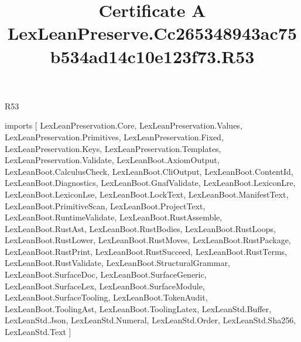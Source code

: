 \begin{lexlean}{R53}
\title{Certificate A LexLeanPreserve.Cc265348943ac75b534ad14c10e123f73.R53}
\begin{coremodule}
imports [
  LexLeanPreservation.Core,
  LexLeanPreservation.Values,
  LexLeanPreservation.Primitives,
  LexLeanPreservation.Fixed,
  LexLeanPreservation.Keys,
  LexLeanPreservation.Templates,
  LexLeanPreservation.Validate,
  LexLeanBoot.AxiomOutput,
  LexLeanBoot.CalculusCheck,
  LexLeanBoot.CliOutput,
  LexLeanBoot.ContentId,
  LexLeanBoot.Diagnostics,
  LexLeanBoot.GnafValidate,
  LexLeanBoot.LexiconLre,
  LexLeanBoot.LexiconLse,
  LexLeanBoot.LockText,
  LexLeanBoot.ManifestText,
  LexLeanBoot.PrimitiveScan,
  LexLeanBoot.ProjectText,
  LexLeanBoot.RuntimeValidate,
  LexLeanBoot.RustAssemble,
  LexLeanBoot.RustAst,
  LexLeanBoot.RustBodies,
  LexLeanBoot.RustLoops,
  LexLeanBoot.RustLower,
  LexLeanBoot.RustMoves,
  LexLeanBoot.RustPackage,
  LexLeanBoot.RustPrint,
  LexLeanBoot.RustSucceed,
  LexLeanBoot.RustTerms,
  LexLeanBoot.RustValidate,
  LexLeanBoot.StructuralGrammar,
  LexLeanBoot.SurfaceDoc,
  LexLeanBoot.SurfaceGeneric,
  LexLeanBoot.SurfaceLex,
  LexLeanBoot.SurfaceModule,
  LexLeanBoot.SurfaceTooling,
  LexLeanBoot.TokenAudit,
  LexLeanBoot.ToolingAst,
  LexLeanBoot.ToolingLatex,
  LexLeanStd.Buffer,
  LexLeanStd.Json,
  LexLeanStd.Numeral,
  LexLeanStd.Order,
  LexLeanStd.Sha256,
  LexLeanStd.Text
]


\end{coremodule}
\end{lexlean}
